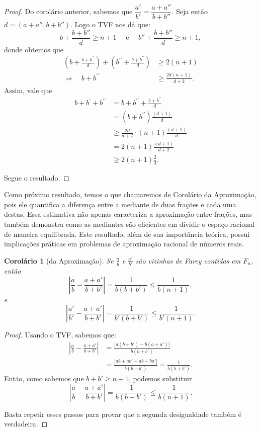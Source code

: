 \documentclass{hipatia}
\newtheorem*{corollary*}{Corolário} %
\theoremstyle{definition} %
\begin{document}
\begin{proof}
    Do corolário anterior, sabemos que $\dfrac{a'}{b'} = \dfrac{a + a''}{b + b''}$. Seja então $d=(a+a'',b+b'')$. Logo o TVF nos dá que:
    $$
    b+\frac{b+b''}{d}\geq n+1\quad \text{ e } \quad b''+\frac{b+b''}{d}\geq n+1,
    $$
\noindent donde obtemos que 
$$
\begin{aligned}
\left(b+\frac{b+b^{\prime \prime}}{d}\right)+\left(b^{\prime \prime}+\frac{b+b^{\prime \prime}}{d}\right) & \geqslant 2(n+1) \\
\Rightarrow \quad b+b^{\prime \prime} & \geqslant \frac{2 d(n+1)}{d+2}.
\end{aligned}
$$
Assim, vale que 
$$
\begin{aligned}
b+b^{\prime}+b^{\prime \prime} & =b+b^{\prime \prime}+\frac{b+b^{\prime \prime}}{d} \\
& =\left(b+b^{\prime \prime}\right) \frac{(d+1)}{d} \\
& \geqslant \frac{2 d}{d+2} \cdot(n+1) \frac{(d+1)}{d} \\
& =2(n+1) \frac{(d+1)}{d+2}\\
&\geq 2(n+1) \frac{2}{3}.
\end{aligned}
$$

Segue o resultado.    
\end{proof}


Como próximo resultado, temos o que chamaremos de Corolário da Aproximação, pois ele quantifica a diferença entre a mediante de duas frações e cada uma destas. Essa estimativa não apenas caracteriza a aproximação entre frações, mas também demonstra como as mediantes são eficientes em dividir o espaço racional de maneira equilibrada. Este resultado, além de sua importância teórica, possui implicações práticas em problemas de aproximação racional de números reais.

\begin{corollary*}[da Aproximação]
Se \(\frac{a}{b}\) e \(\frac{a'}{b'}\) são vizinhas de Farey contidas em \(F_n\), então
\[
\left| \frac{a}{b} - \frac{a + a'}{b + b'} \right| = \frac{1}{b(b + b')} \leq \frac{1}{b(n + 1)},
\]
e
\[
\left| \frac{a'}{b'} - \frac{a + a'}{b + b'} \right| = \frac{1}{b'(b + b')} \leq \frac{1}{b'(n + 1)}.
\]
\end{corollary*}



\begin{proof}
Usando o TVF, sabemos que:
\begin{align*}
\left| \frac{a}{b} - \frac{a + a'}{b + b'} \right| &= \frac{|a(b + b') - b(a + a')|}{b(b + b')} \\
&= \frac{|ab + ab' - ab - ba'|}{b(b + b')} = \frac{1}{b(b + b')}.
\end{align*}
Então, como sabemos que \(b + b' \geq n + 1\), podemos substituir
\[
\left| \frac{a}{b} - \frac{a + a'}{b + b'} \right| = \frac{1}{b(b + b')} \leq \frac{1}{b(n + 1)}.
\]

Basta repetir esses passos para provar que a segunda desigualdade também é verdadeira.
\end{proof}
\end{document}
